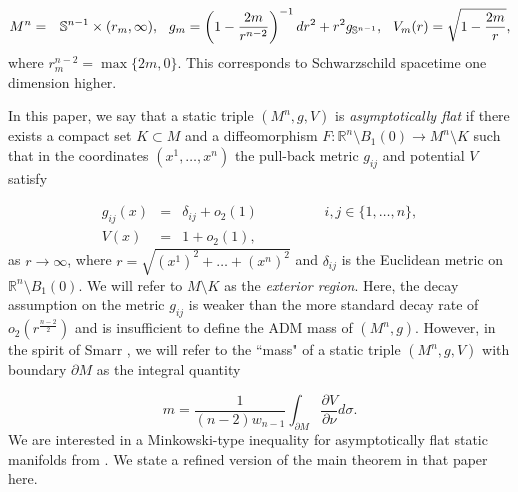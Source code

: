 \documentclass[12pt,twoside]{article}
\theoremstyle{plain}
\theoremstyle{definition}
\theoremstyle{remark}
\numberwithin{equation}{section}
\begin{document}
\begin{eqnarray} \label{schwarzschild}
    M^{n}&=& \mathbb{S}^{n-1} \times (r_{m},\infty), \hspace{0.25cm} g_{m}= \left(1-\frac{2m}{r^{n-2}}\right)^{-1} dr^{2} + r^{2}g_{\mathbb{S}^{n-1}}, \hspace{0.25cm} V_{m}(r)= \sqrt{1 - \frac{2m}{r}},
\end{eqnarray}    
 where $r_{m}^{n-2}=\max\{2m, 0\}$. This corresponds to Schwarzschild spacetime one dimension higher.

In this paper, we say that a static triple $(M^{n},g,V)$ is \textit{asymptotically flat} if there exists a compact set $K \subset M$ and a diffeomorphism $F: \mathbb{R}^{n} \setminus B_{1}(0) \rightarrow M^{n} \setminus K$ such that in the coordinates $(x^{1},\dots,x^{n})$ the pull-back metric $g_{ij}$ and potential $V$ satisfy

    \begin{eqnarray}
     g_{ij}(x) &=& \delta_{ij} + o_{2} (1) \hspace{2cm} i,j \in \{ 1, \dots, n \} , \label{af} \\
       V(x) &=& 1 + o_{2}(1), \label{V_decay}
    \end{eqnarray}
as $r \rightarrow \infty$, where  $r= \sqrt{(x^{1})^{2} + \dots + (x^{n})^{2}}$ and $\delta_{ij}$ is the Euclidean metric on $\mathbb{R}^{n} \setminus B_{1}(0)$. We will refer to $M \setminus K$ as the {\it exterior region}. Here, the decay assumption on the metric $g_{ij}$ is weaker than the more standard decay rate of $o_{2}(r^{\frac{n-2}{2}})$ and is insufficient to define the ADM mass of $(M^{n},g)$. However, in the spirit of Smarr \cite{Smarr}, we will refer to the ``mass" of a static triple $(M^{n},g,V)$ with boundary $\partial M$ as the integral quantity

\begin{equation} \label{mass}
    m = \frac{1}{(n-2)w_{n-1}} \int_{\partial M} \frac{\partial V}{\partial \nu} d\sigma.
\end{equation}
We are interested in a Minkowski-type inequality for asymptotically flat static manifolds from \cite{Mc}. We state a refined version of the main theorem in that paper here.
\end{document}
